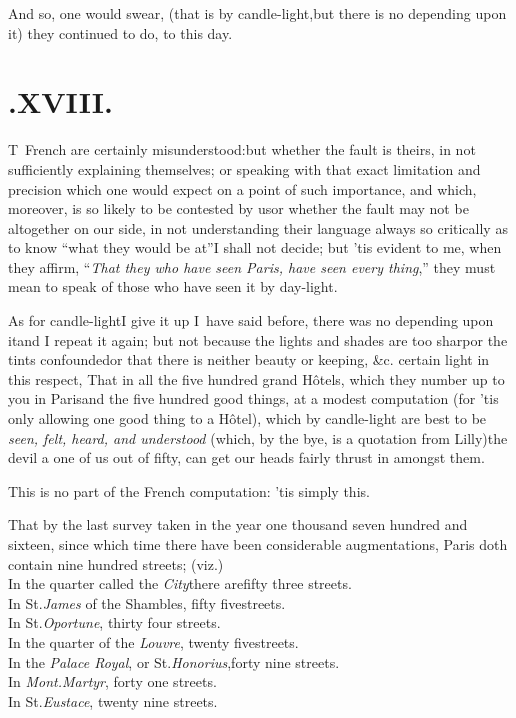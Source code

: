 \documentclass{article}
\begin{document}
\tsk And so, one would swear, (that is by candle-light,\tsk but there is no depending
upon it) they continued to do, to this day.

\newpage
\section{.\enspace XVIII.}

\lettrine{T}{\,} French are certainly misunderstood:\tsh but whether the fault is theirs,
in not sufficiently explaining themselves; or speaking with that exact limitation
and precision which one would expect on a point of such importance, and which,
moreover, is so likely to be contested by us\tsh or whether the fault may not be
altogether on our side, in not understanding their language always so critically as
to know “what they would be at”\tsh I shall not decide; but ’tis evident to me, when
they affirm, “\textit{That they who have seen Paris, have seen every thing},” they
must mean to speak of those who have seen it by day-light.

\newpage
As for candle-light\tsk I give it up\tsh{} I~have said
before, there was no depending upon it\tsk and I repeat it again;
but not because the lights and shades are too sharp\tsk or the
tints confounded\tsk or that there is neither beauty or keeping,
\&c.\break
{}
certain light in this respect, That in all the five
hundred grand Hôtels, which they number up to you in
Paris\tsk and the five hundred good things, at a modest
computation (for ’tis only allowing one good thing to a
Hôtel), which by candle-light are best to be \textit{seen, felt,
heard, and understood} (which, by the bye, is a quotation
from Lilly)\tsh the devil a one of us out of fifty,
can get our heads fairly thrust in amongst them.

\newpage
This is no part of the French computation: ’tis
simply this.

\def\bnq{\break\null\quad}
That by the last survey taken in the year one thousand seven
hundred and sixteen, since which time there have been considerable
augmentations, Paris doth contain nine hundred streets;
(viz.)\\[2pt]
In the quarter called the \textit{City}\tsk there are\break\null\quad fifty three streets.\\
In St.\@ \textit{James} of the Shambles, fifty five\break\null\quad streets.\\
In St.\@ \textit{Oportune}, thirty four streets.\\
In the quarter of the \textit{Louvre}, twenty five\break\null\quad streets.\\
In the \textit{Palace Royal}, or St.\@ \textit{Honorius},\break\null\quad forty nine streets.\\
In \textit{Mont.\@ Martyr}, forty one streets.\\
In St.\@ \textit{Eustace}, twenty nine streets.
\end{document}
